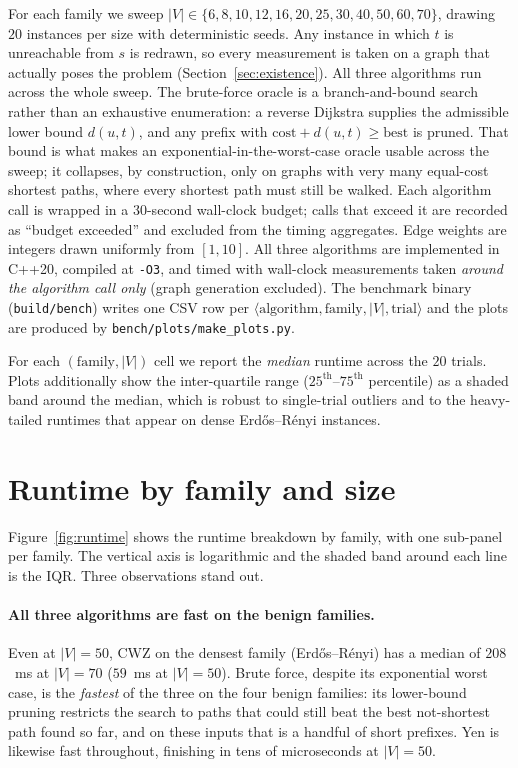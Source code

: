For each family we sweep $|V|\in\{6,8,10,12,16,20,25,30,40,50,60,70\}$, drawing
$20$ instances per size with deterministic seeds. Any instance in which $t$
is unreachable from $s$ is redrawn, so every measurement is taken on a graph
that actually poses the problem (Section~\ref{sec:existence}). All three
algorithms run across the whole sweep. The brute-force oracle is a branch-and-bound search
rather than an exhaustive enumeration: a reverse Dijkstra supplies the
admissible lower bound $d(u,t)$, and any prefix with
$\text{cost}+d(u,t)\ge\text{best}$ is pruned. That bound is what makes an
exponential-in-the-worst-case oracle usable across the sweep; it collapses,
by construction, only on graphs with very many equal-cost shortest paths,
where every shortest path must still be walked. Each algorithm call is
wrapped in a $30$-second wall-clock
budget; calls that exceed it are recorded as ``budget exceeded'' and
excluded from the timing aggregates. Edge weights are integers drawn
uniformly from $[1,10]$. All three algorithms are implemented in C++20,
compiled at \texttt{-O3}, and timed with wall-clock measurements taken
\emph{around the algorithm call only} (graph generation excluded). The
benchmark binary (\texttt{build/bench}) writes one CSV row per
$\langle\text{algorithm},\text{family},|V|,\text{trial}\rangle$ and the
plots are produced by \texttt{bench/plots/make\_plots.py}.

For each $(\text{family},|V|)$ cell we report the \emph{median} runtime
across the $20$ trials. Plots additionally show the inter-quartile range
($25^{\text{th}}$--$75^{\text{th}}$ percentile) as a shaded band around
the median, which is robust to single-trial outliers and to the
heavy-tailed runtimes that appear on dense Erd\H{o}s--R\'enyi instances.

\section{Runtime by family and size}
\label{sec:runtime-by-family}

Figure~\ref{fig:runtime} shows the runtime breakdown by family, with one
sub-panel per family. The vertical axis is logarithmic and the shaded
band around each line is the IQR. Three observations stand out.

\paragraph{All three algorithms are fast on the benign families.}
Even at $|V|=50$, CWZ on the densest family (Erd\H{o}s--R\'enyi) has a
median of $208$~ms at $|V|=70$ ($59$~ms at $|V|=50$). Brute force, despite its exponential worst case, is
the \emph{fastest} of the three on the four benign families: its lower-bound
pruning restricts the search to paths that could still beat the best
not-shortest path found so far, and on these inputs that is a handful of
short prefixes. Yen is likewise fast throughout, finishing in tens of
microseconds at $|V|=50$.

